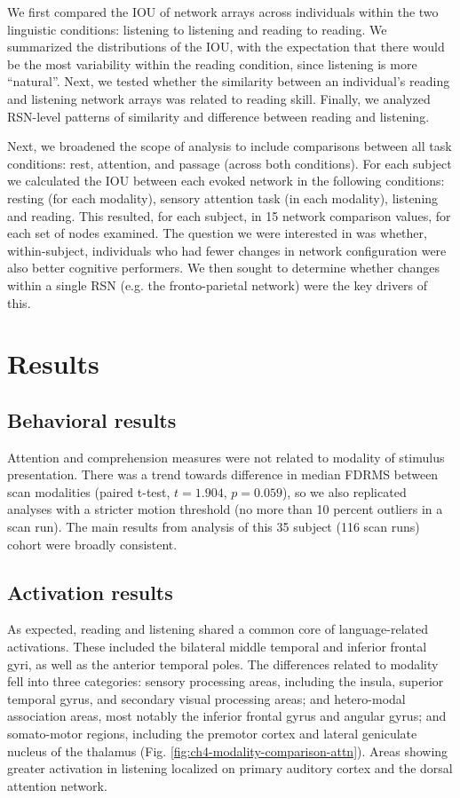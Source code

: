 We first compared the IOU of network arrays across individuals within the two linguistic conditions: listening to listening and reading to reading. We summarized the distributions of the IOU, with the expectation that there would be the most variability within the reading condition, since listening is more ``natural''. Next, we tested whether the similarity between an individual's reading and listening network arrays was related to reading skill. Finally, we analyzed RSN-level patterns of similarity and difference between reading and listening. 

Next, we broadened the scope of analysis to include comparisons between all task conditions: rest, attention, and passage (across both conditions). For each subject we calculated the IOU between each evoked network in the following conditions: resting (for each modality), sensory attention task (in each modality), listening and reading. This resulted, for each subject, in 15 network comparison values, for each set of nodes examined. The question we were interested in was whether, within-subject, individuals who had fewer changes in network configuration were also better cognitive performers. We then sought to determine whether changes within a single RSN (e.g. the fronto-parietal network) were the key drivers of this. 


\section{Results}

\subsection{Behavioral results}

Attention and comprehension measures were not related to modality of stimulus presentation. There was a trend towards difference in median FDRMS between scan modalities (paired t-test, $t = 1.904$, $p = 0.059$), so we also replicated analyses with a stricter motion threshold (no more than 10 percent outliers in a scan run). The main results from analysis of this 35 subject (116 scan runs) cohort were broadly consistent.

\subsection{Activation results}

As expected, reading and listening shared a common core of language-related activations. These included the bilateral middle temporal and inferior frontal gyri, as well as the  anterior temporal poles. The differences related to modality fell into three categories: sensory processing areas, including the insula, superior temporal gyrus, and secondary visual processing areas; and hetero-modal association areas, most notably the inferior frontal gyrus and angular gyrus; and somato-motor regions, including the premotor cortex and lateral geniculate nucleus of the thalamus (Fig. \ref{fig:ch4-modality-comparison-attn}). Areas showing greater activation in listening localized on primary auditory cortex and the dorsal attention network.

